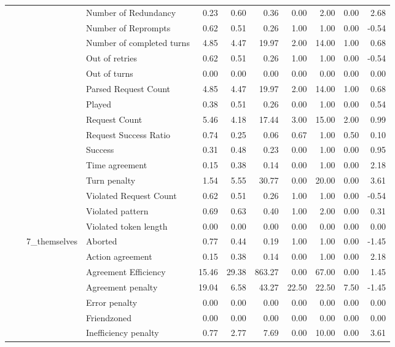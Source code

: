 \begin{tabular}{llllrrrrrrr}
 &  &  & Number of Redundancy & 0.23 & 0.60 & 0.36 & 0.00 & 2.00 & 0.00 & 2.68 \\
 &  &  & Number of Reprompts & 0.62 & 0.51 & 0.26 & 1.00 & 1.00 & 0.00 & -0.54 \\
 &  &  & Number of completed turns & 4.85 & 4.47 & 19.97 & 2.00 & 14.00 & 1.00 & 0.68 \\
 &  &  & Out of retries & 0.62 & 0.51 & 0.26 & 1.00 & 1.00 & 0.00 & -0.54 \\
 &  &  & Out of turns & 0.00 & 0.00 & 0.00 & 0.00 & 0.00 & 0.00 & 0.00 \\
 &  &  & Parsed Request Count & 4.85 & 4.47 & 19.97 & 2.00 & 14.00 & 1.00 & 0.68 \\
 &  &  & Played & 0.38 & 0.51 & 0.26 & 0.00 & 1.00 & 0.00 & 0.54 \\
 &  &  & Request Count & 5.46 & 4.18 & 17.44 & 3.00 & 15.00 & 2.00 & 0.99 \\
 &  &  & Request Success Ratio & 0.74 & 0.25 & 0.06 & 0.67 & 1.00 & 0.50 & 0.10 \\
 &  &  & Success & 0.31 & 0.48 & 0.23 & 0.00 & 1.00 & 0.00 & 0.95 \\
 &  &  & Time agreement & 0.15 & 0.38 & 0.14 & 0.00 & 1.00 & 0.00 & 2.18 \\
 &  &  & Turn penalty & 1.54 & 5.55 & 30.77 & 0.00 & 20.00 & 0.00 & 3.61 \\
 &  &  & Violated Request Count & 0.62 & 0.51 & 0.26 & 1.00 & 1.00 & 0.00 & -0.54 \\
 &  &  & Violated pattern & 0.69 & 0.63 & 0.40 & 1.00 & 2.00 & 0.00 & 0.31 \\
 &  &  & Violated token length & 0.00 & 0.00 & 0.00 & 0.00 & 0.00 & 0.00 & 0.00 \\
\cline{3-11}
 &  & \multirow[t]{27}{*}{7_themselves} & Aborted & 0.77 & 0.44 & 0.19 & 1.00 & 1.00 & 0.00 & -1.45 \\
 &  &  & Action agreement & 0.15 & 0.38 & 0.14 & 0.00 & 1.00 & 0.00 & 2.18 \\
 &  &  & Agreement Efficiency & 15.46 & 29.38 & 863.27 & 0.00 & 67.00 & 0.00 & 1.45 \\
 &  &  & Agreement penalty & 19.04 & 6.58 & 43.27 & 22.50 & 22.50 & 7.50 & -1.45 \\
 &  &  & Error penalty & 0.00 & 0.00 & 0.00 & 0.00 & 0.00 & 0.00 & 0.00 \\
 &  &  & Friendzoned & 0.00 & 0.00 & 0.00 & 0.00 & 0.00 & 0.00 & 0.00 \\
 &  &  & Inefficiency penalty & 0.77 & 2.77 & 7.69 & 0.00 & 10.00 & 0.00 & 3.61 \\

\end{tabular}
